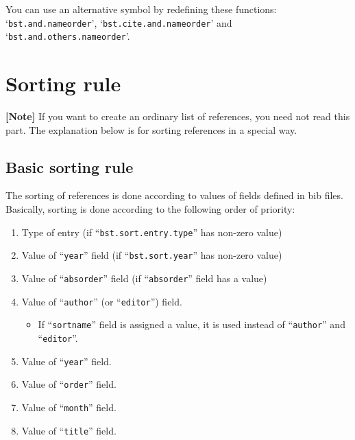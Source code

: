 \documentclass[10pt]{article}
\begin{document}
You can use an alternative symbol by redefining these functions:
`\texttt{bst.and.nameorder}', `\texttt{bst.cite.and.nameorder}' and
`\texttt{bst.and.others.nameorder}'.


\section{Sorting rule}
\label{sec:sort_rule}

\noindent \textbf{[Note]} If you want to create an ordinary list of
references, you need not  read this part.  The explanation below is
for sorting references in a special way.

\subsection{Basic sorting rule}

The sorting of references is done according to values of fields defined
in bib files.  Basically, sorting is done according to the following
order of priority:
\begin{enumerate}
 \item Type of entry (if ``\texttt{bst.sort.entry.type}'' has non-zero value)
 \item Value of ``\texttt{year}'' field (if ``\texttt{bst.sort.year}'' has non-zero value)
 \item Value of ``\texttt{absorder}'' field (if ``\texttt{absorder}'' field has
       a value)
 \item Value of ``\texttt{author}'' (or ``\texttt{editor}'') field.
       \begin{itemize}
        \item If ``\texttt{sortname}'' field is assigned a value, it is used
              instead of ``\texttt{author}'' and ``\texttt{editor}''.
       \end{itemize}
 \item Value of ``\texttt{year}'' field.
 \item Value of ``\texttt{order}'' field.
 \item Value of ``\texttt{month}'' field.
 \item Value of ``\texttt{title}'' field.
\end{enumerate}
\end{document}
